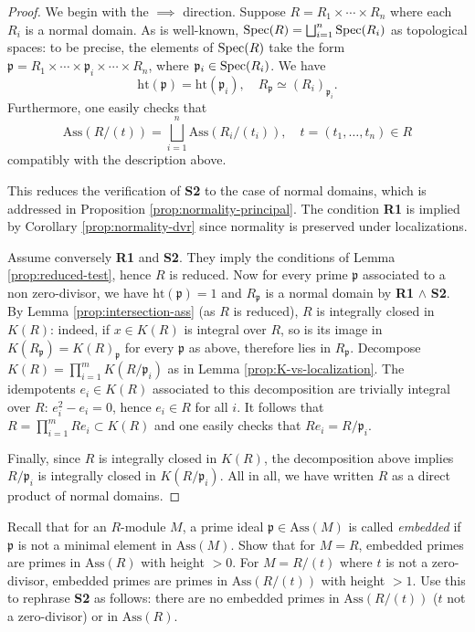 \begin{proof}
	We begin with the $\implies$ direction. Suppose $R = R_1 \times \cdots \times R_n$ where each $R_i$ is a normal domain. As is well-known, $\operatorname{Spec}(R) = \bigsqcup_{i=1}^n \operatorname{Spec}(R_i)$ as topological spaces: to be precise, the elements of $\operatorname{Spec}(R)$ take the form $\mathfrak{p} = R_1 \times \cdots \times \mathfrak{p}_i \times \cdots \times R_n$, where $\mathfrak{p}_i \in \operatorname{Spec}(R_i)$. We have
	\[ \text{ht}(\mathfrak{p}) = \text{ht}(\mathfrak{p}_i), \quad R_{\mathfrak{p}} \simeq (R_i)_{\mathfrak{p}_i}. \]
	Furthermore, one easily checks that
	\[ \text{Ass}(R/(t)) = \bigsqcup_{i=1}^n \text{Ass}(R_i/(t_i)), \quad t = (t_1, \ldots, t_n) \in R \]
	compatibly with the description above.
	
	This reduces the verification of \textbf{S2} to the case of normal domains, which is addressed in Proposition \ref{prop:normality-principal}. The condition \textbf{R1} is implied by Corollary \ref{prop:normality-dvr} since normality is preserved under localizations.
	
	Assume conversely \textbf{R1} and \textbf{S2}. They imply the conditions of Lemma \ref{prop:reduced-test}, hence $R$ is reduced. Now for every prime $\mathfrak{p}$ associated to a non zero-divisor, we have $\text{ht}(\mathfrak{p})=1$ and $R_{\mathfrak{p}}$ is a normal domain by \textbf{R1} $\wedge$ \textbf{S2}. By Lemma \ref{prop:intersection-ass} (as $R$ is reduced), $R$ is integrally closed in $K(R)$: indeed, if $x \in K(R)$ is integral over $R$, so is its image in $K(R_{\mathfrak{p}}) = K(R)_{\mathfrak{p}}$ for every $\mathfrak{p}$ as above, therefore lies in $R_{\mathfrak{p}}$. Decompose $K(R) = \prod_{i=1}^m K(R/\mathfrak{p}_i)$ as in Lemma \ref{prop:K-vs-localization}. The idempotents $e_i \in K(R)$ associated to this decomposition are trivially integral over $R$: $e_i^2 - e_i = 0$, hence $e_i \in R$ for all $i$. It follows that $R = \prod_{i=1}^m Re_i \subset K(R)$ and one easily checks that $Re_i = R/\mathfrak{p}_i$.
	
	Finally, since $R$ is integrally closed in $K(R)$, the decomposition above implies $R/\mathfrak{p}_i$ is integrally closed in $K(R/\mathfrak{p}_i)$. All in all, we have written $R$ as a direct product of normal domains.
\end{proof}

\begin{exercise}
	Recall that for an $R$-module $M$, a prime ideal $\mathfrak{p} \in \text{Ass}(M)$ is called \emph{embedded} if $\mathfrak{p}$ is not a minimal element in $\text{Ass}(M)$. Show that for $M=R$, embedded primes are primes in $\text{Ass}(R)$ with height $> 0$. For $M=R/(t)$ where $t$ is not a zero-divisor, embedded primes are primes in $\text{Ass}(R/(t))$ with height $> 1$. Use this to rephrase \textbf{S2} as follows: there are no embedded primes in $\text{Ass}(R/(t))$ ($t$ not a zero-divisor) or in $\text{Ass}(R)$.
\end{exercise}

